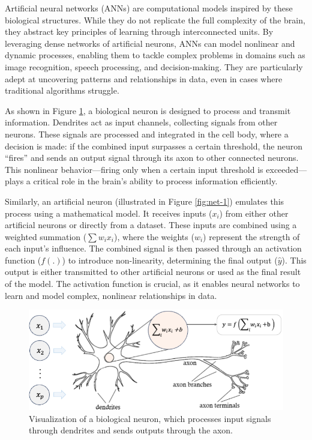 \documentclass[
]{book}
\theoremstyle{definition}
\theoremstyle{definition}
\theoremstyle{definition}
\theoremstyle{definition}
\theoremstyle{remark}
\begin{document}
Artificial neural networks (ANNs) are computational models inspired by these biological structures. While they do not replicate the full complexity of the brain, they abstract key principles of learning through interconnected units. By leveraging dense networks of artificial neurons, ANNs can model nonlinear and dynamic processes, enabling them to tackle complex problems in domains such as image recognition, speech processing, and decision-making. They are particularly adept at uncovering patterns and relationships in data, even in cases where traditional algorithms struggle.

As shown in Figure \ref{fig:net-brain}, a biological neuron is designed to process and transmit information. Dendrites act as input channels, collecting signals from other neurons. These signals are processed and integrated in the cell body, where a decision is made: if the combined input surpasses a certain threshold, the neuron ``fires'' and sends an output signal through its axon to other connected neurons. This nonlinear behavior---firing only when a certain input threshold is exceeded---plays a critical role in the brain's ability to process information efficiently.

Similarly, an artificial neuron (illustrated in Figure \ref{fig:net-1}) emulates this process using a mathematical model. It receives inputs (\(x_i\)) from either other artificial neurons or directly from a dataset. These inputs are combined using a weighted summation (\(\sum w_i x_i\)), where the weights (\(w_i\)) represent the strength of each input's influence. The combined signal is then passed through an activation function (\(f(.)\)) to introduce non-linearity, determining the final output (\(\hat{y}\)). This output is either transmitted to other artificial neurons or used as the final result of the model. The activation function is crucial, as it enables neural networks to learn and model complex, nonlinear relationships in data.

\begin{figure}

{\centering \includegraphics[width=0.75\linewidth]{images/net_brain} 

}

\caption{Visualization of a biological neuron, which processes input signals through dendrites and sends outputs through the axon.}\label{fig:net-brain}
\end{figure}
\end{document}
